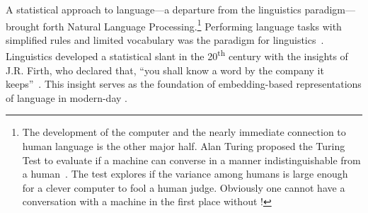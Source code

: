 A statistical approach to language---a departure from the linguistics paradigm---brought forth Natural Language Processing.\footnote{The development of the computer and the nearly immediate connection to human language is the other major half.  	 Alan Turing proposed the Turing Test to evaluate if a machine can converse in a manner indistinguishable from a human~\citep{turing1950computing}.  	
%	
The test  explores if the variance among humans is large enough for a clever computer to fool a human judge.  
%
Obviously one cannot have a conversation with a machine in the first place without \nlp{}!}
%
Performing language tasks with simplified rules and limited vocabulary was the paradigm for linguistics~\citep{wittgenstein1953philosophical, berko1958child}.  
%
Linguistics developed a statistical slant in the 20\textsuperscript{th} century with the insights of J.R. Firth, who declared that, ``you shall know a word by the company it keeps''~\citep{firth1957synopsis}.
%
This insight serves as the foundation of embedding-based representations of language in modern-day \nlp{}.  

\begin{comment}
RIP attempt at linguistics discussion
\citet{chomsky1986knowledge}'s Universal Grammar serves as a stepping stone between linguistics and information theory.  
%
The existence of an innate predisposition to language in children, rather than a dependence on learning everything, precipitates the application of statistics to language.  
%
If grammar can be universal, why could statistics not be applied to all languages in a universal manner?
%
\end{comment}


\begin{comment}
The major milestones are the development of Zipf's Law, information theory, artificial intelligence, and universal grammar, which are discussed in chronological order.     


First, \citet{zipf1935psycho} introduced Zipf's Law, which notes that there is a strong relationship between the rank of a word and its frequency:
the first-order word occurs notably more often than the second-order word, the second-order word occurs more often than the third-order word, and so on.   
%  
This statistical distribution of language is necessary for machine learning to work and this insight applies not only to words, but to phrases~\citep{williams2015zipf}, language learning~\citep{powers1998applications}, and many non-\nlp{} phenomena such as website usage~\citep{jiang2013understanding}.  

Following this insight, \citet{shannon1949mathematical} proposed information theory, which reduces linguistic information to a numerical representation.  
%
\end{comment}


